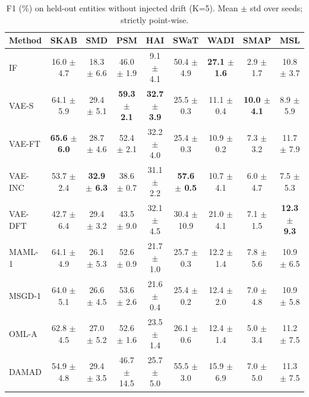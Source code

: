 \begin{table}[t]
\centering
\small
\caption{F1 (\%) on held-out entities without injected drift (K=5). Mean $\pm$ std over seeds; strictly point-wise.}
\label{tab:cold_f1}
\begin{tabular}{lcccccccc}
\toprule
Method & SKAB & SMD & PSM & HAI & SWaT & WADI & SMAP & MSL \\
\midrule
IF & 16.0 $\pm$ 4.7 & 18.3 $\pm$ 6.6 & 46.0 $\pm$ 1.9 & 9.1 $\pm$ 4.1 & 50.4 $\pm$ 4.9 & \textbf{27.1 $\pm$ 1.6} & 2.9 $\pm$ 1.7 & 10.8 $\pm$ 3.7 \\
VAE-S & 64.1 $\pm$ 5.9 & 29.4 $\pm$ 5.1 & \textbf{59.3 $\pm$ 2.1} & \textbf{32.7 $\pm$ 3.9} & 25.5 $\pm$ 0.3 & 11.1 $\pm$ 0.4 & \textbf{10.0 $\pm$ 4.1} & 8.9 $\pm$ 5.9 \\
VAE-FT & \textbf{65.6 $\pm$ 6.0} & 28.7 $\pm$ 4.6 & 52.4 $\pm$ 2.1 & 32.2 $\pm$ 4.0 & 25.4 $\pm$ 0.3 & 10.9 $\pm$ 0.2 & 7.3 $\pm$ 3.2 & 11.7 $\pm$ 7.9 \\
VAE-INC & 53.7 $\pm$ 2.4 & \textbf{32.9 $\pm$ 6.3} & 38.6 $\pm$ 0.7 & 31.1 $\pm$ 2.2 & \textbf{57.6 $\pm$ 0.5} & 10.7 $\pm$ 4.1 & 6.0 $\pm$ 4.7 & 7.5 $\pm$ 5.3 \\
VAE-DFT & 42.7 $\pm$ 6.4 & 29.4 $\pm$ 3.2 & 43.5 $\pm$ 9.0 & 32.1 $\pm$ 4.5 & 30.4 $\pm$ 10.9 & 21.0 $\pm$ 4.1 & 7.1 $\pm$ 1.5 & \textbf{12.3 $\pm$ 9.3} \\
MAML-1 & 64.1 $\pm$ 4.9 & 26.1 $\pm$ 5.3 & 52.6 $\pm$ 0.9 & 21.7 $\pm$ 1.0 & 25.7 $\pm$ 0.3 & 12.2 $\pm$ 1.4 & 7.8 $\pm$ 5.6 & 10.9 $\pm$ 6.5 \\
MSGD-1 & 64.0 $\pm$ 5.1 & 26.6 $\pm$ 4.5 & 53.6 $\pm$ 2.6 & 21.6 $\pm$ 0.4 & 25.4 $\pm$ 0.2 & 12.4 $\pm$ 2.0 & 7.0 $\pm$ 4.8 & 10.9 $\pm$ 5.8 \\
OML-A & 62.8 $\pm$ 4.5 & 27.0 $\pm$ 5.2 & 52.6 $\pm$ 1.6 & 23.5 $\pm$ 1.4 & 26.1 $\pm$ 0.6 & 12.4 $\pm$ 1.4 & 5.0 $\pm$ 3.4 & 11.2 $\pm$ 7.5 \\
DAMAD & 54.9 $\pm$ 4.8 & 29.4 $\pm$ 3.5 & 46.7 $\pm$ 14.5 & 25.7 $\pm$ 5.0 & 55.5 $\pm$ 3.0 & 15.9 $\pm$ 6.9 & 7.0 $\pm$ 5.0 & 11.3 $\pm$ 7.5 \\
\bottomrule
\end{tabular}
\end{table}

